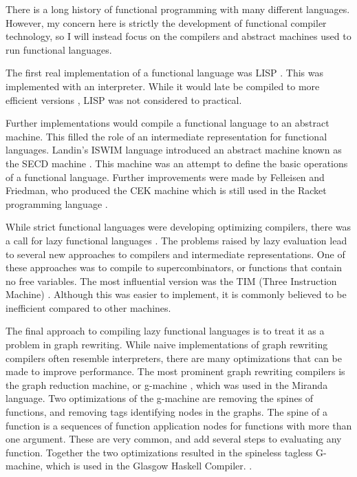 
There is a long history of functional programming with many different languages.
However, my concern here is strictly the development of functional compiler technology,
so I will instead focus on the compilers and abstract machines used to run functional languages.

The first real implementation of a functional language was LISP \cite{lisp}.
This was implemented with an interpreter.
While it would late be compiled to more efficient versions \cite{steele78,orbit},
LISP was not considered to practical.

Further implementations would compile a functional language to an abstract machine.
This filled the role of an intermediate representation for functional languages.
Landin's ISWIM language introduced an abstract machine known as the SECD machine \cite{secd}.
This machine was an attempt to define the basic operations of a functional language.
Further improvements were made by Felleisen and Friedman, who produced the CEK machine which is still used in the Racket
programming language \cite{cek}.

While strict functional languages were developing optimizing compilers,
there was a call for lazy functional languages \cite{cons-args}.
The problems raised by lazy evaluation lead to several new approaches to compilers
and intermediate representations.
One of these approaches was to compile to supercombinators,
or functions that contain no free variables.
The most influential version was the TIM (Three Instruction Machine) \cite{tim}.
Although this was easier to implement, it is commonly believed to be inefficient compared to other machines.

The final approach to compiling lazy functional languages is to treat it as a problem in
graph rewriting.
While naive implementations of graph rewriting compilers often resemble interpreters,
there are many optimizations that can be made to improve performance.
The most prominent graph rewriting compilers
is the graph reduction machine, or g-machine \cite{gmachine},
which was used in the Miranda language. 
Two optimizations of the g-machine are removing the spines of functions,
and removing tags identifying nodes in the graphs.
The spine of a function is a sequences of function application
nodes for functions with more than one argument.
These are very common, and add several steps to evaluating any function.
Together the two optimizations resulted in the spineless tagless G-machine,
which is used in the Glasgow Haskell Compiler. \cite{functional_PeytonJones, ghc}.

